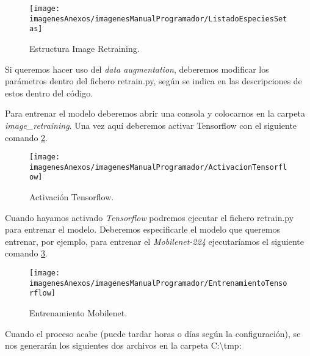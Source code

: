 \begin{figure}[h]
    \begin{center}%
        \begin{center}%
          \texttt{[image: imagenesAnexos/imagenesManualProgramador/ListadoEspeciesSetas]}%
          \caption{Estructura Image Retraining.}%
          \label{figListadoEspeciesSetas}%
        \end{center}%
  	\end{center}%
\end{figure}%

Si queremos hacer uso del \textit{data augmentation}, deberemos modificar los parámetros dentro del fichero retrain.py, según se indica en las descripciones de estos dentro del código.

Para entrenar el modelo deberemos abrir una consola y colocarnos en la carpeta \textit{image\_retraining}. Una vez aquí deberemos activar Tensorflow con el siguiente comando \ref{figActivacionTensorflow}.

\begin{figure}[h]
    \begin{center}%
        \begin{center}%
          \texttt{[image: imagenesAnexos/imagenesManualProgramador/ActivacionTensorflow]}%
          \caption{Activación Tensorflow.}%
          \label{figActivacionTensorflow}%
        \end{center}%
  	\end{center}%
\end{figure}%

Cuando hayamos activado \textit{Tensorflow} podremos ejecutar el fichero retrain.py para entrenar el modelo. Deberemos especificarle el modelo que queremos entrenar, por ejemplo, para entrenar el \textit{Mobilenet-224} ejecutaríamos el siguiente comando \ref{figEntrenamientoTensorflow}.

\begin{figure}[h]
    \begin{center}%
        \begin{center}%
          \texttt{[image: imagenesAnexos/imagenesManualProgramador/EntrenamientoTensorflow]}%
          \caption{Entrenamiento Mobilenet.}%
          \label{figEntrenamientoTensorflow}%
        \end{center}%
  	\end{center}%
\end{figure}%
\newpage
Cuando el proceso acabe (puede tardar horas o días según la configuración), se nos generarán los siguientes dos archivos en la carpeta C:\textbackslash tmp:

